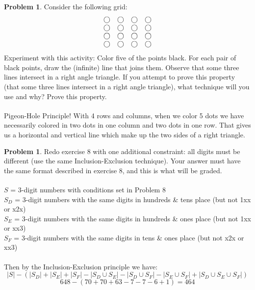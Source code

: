 \documentclass[10pt,leqno ]{article}
\theoremstyle{definition}
\newtheorem{problem}[theorem]{Problem}
\begin{document}
\begin{problem} Consider the following grid:
\begin{displaymath}
\begin{array}{c c c c}
\bigcirc & \bigcirc & \bigcirc & \bigcirc \\
\bigcirc & \bigcirc & \bigcirc & \bigcirc \\
\bigcirc & \bigcirc & \bigcirc & \bigcirc \\
\bigcirc & \bigcirc & \bigcirc & \bigcirc \\
\end{array}
\end{displaymath}
Experiment with this activity:  Color five of the points black.  For each pair of black points, draw the (infinite) line that joins them.  Observe that some three lines intersect in a right angle triangle.  If you attempt to prove this property (that some three lines intersect in a right angle triangle), what technique will you use and why?  Prove this property.
\\\\
\Large
Pigeon-Hole Principle!  With 4 rows and columns, when we color 5 dots we have necessarily colored in two dots in one column and two dots in one row.  That gives us a horizontal and vertical line which make up the two sides of a right triangle. 
\end{problem}
\newpage

\begin{problem} Redo exercise 8 with one additional constraint:  all digits must be different (use the same Inclusion-Exclusion technique).  Your answer must have the same format described in exercise 8, and this is what will be graded.
\\\\
\Large
$S$ = 3-digit numbers with conditions set in Problem 8\\
$S_D$ = 3-digit numbers with the same digits in hundreds \& tens place (but not 1xx or x2x)\\
$S_E$ = 3-digit numbers with the same digits in hundreds \& ones place (but not 1xx or xx3)\\
$S_F$ = 3-digit numbers with the same digits in tens \& ones place (but not x2x or xx3)\\
\\
Then by the Inclusion-Exclusion principle we have:
$$|S| - (|S_D| + |S_E| + |S_F| - |S_D \cup S_E| - |S_D \cup S_F|- |S_E \cup S_F| + |S_D \cup S_E \cup S_F|)$$
$$648 - (70 + 70 + 63 - 7 - 7 - 6 + 1) = 464$$
\end{problem}
\newpage
\end{document}
